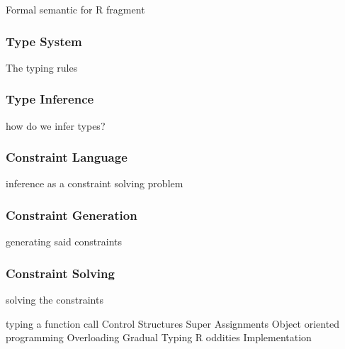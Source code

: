 Formal semantic for R fragment

\subsubsection{Type System}

The typing rules

\subsubsection{Type Inference}

how do we infer types?

\subsubsection{Constraint Language}

inference as a constraint solving problem

\subsubsection{Constraint Generation}

generating said constraints

\subsubsection{Constraint Solving}

solving the constraints


typing a function call
Control Structures
Super Assignments
Object oriented programming
Overloading
Gradual Typing
R oddities
Implementation
